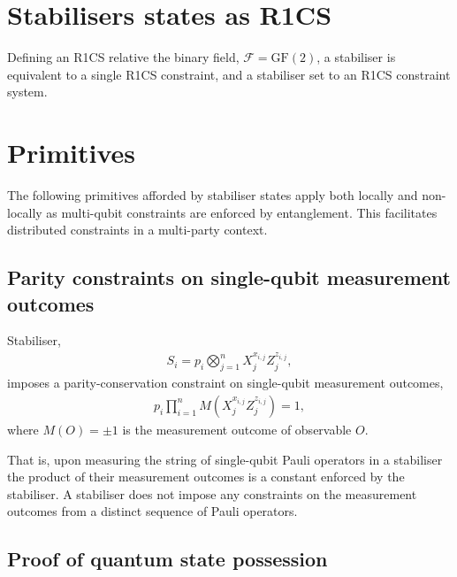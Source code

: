 \documentclass[twocolumn, aps, amsmath, amssymb, nofootinbib, superscriptaddress, longbibliography, doublefloatfix, table-of-contents, eqsecnum, rmp]{revtex4-2}
\begin{document}
\section{Stabilisers states as R1CS}

Defining an R1CS relative the binary field, $\mathcal{F}=\mathrm{GF}(2)$, a stabiliser is equivalent to a single R1CS constraint, and a stabiliser set to an R1CS constraint system.


\section{Primitives}

The following primitives afforded by stabiliser states apply both locally and non-locally as multi-qubit constraints are enforced by entanglement. This facilitates distributed constraints in a multi-party context.

\subsection{Parity constraints on single-qubit measurement outcomes}

Stabiliser,
\begin{align}
	S_i = p_i \bigotimes_{j=1}^n X_j^{x_{i,j}}Z_j^{z_{i,j}},
\end{align}
imposes a parity-conservation constraint on single-qubit measurement outcomes,
\begin{align}
	p_i \prod_{i=1}^n M(X_j^{x_{i,j}}Z_j^{z_{i,j}}) = 1,
\end{align}
where $M(O)=\pm 1$ is the measurement outcome of observable $O$. 

That is, upon measuring the string of single-qubit Pauli operators in a stabiliser the product of their measurement outcomes is a constant enforced by the stabiliser. A stabiliser does not impose any constraints on the measurement outcomes from a distinct sequence of Pauli operators.

\subsection{Proof of quantum state possession}
\end{document}
